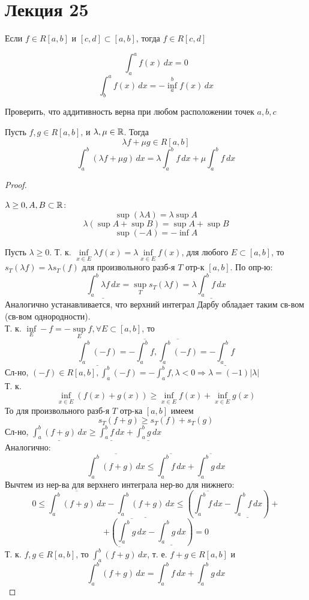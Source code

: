 \section{Лекция 25}
\begin{consequence}
  Если $f \in R[a, b]$ и $[c, d] \subset [a, b]$, тогда $f \in R[c, d]$
\end{consequence}
\begin{note}
  \[
  \int_{a}^{a} f(x) \, dx = 0
  \]
  \[
  \int_{b}^{a} f(x) \, dx = -\inf_{a}^{b} f(x) \, dx
  \]
\end{note}
\begin{task}
Проверить, что аддитивность верна при любом расположении точек $a, b, c$
\end{task}
\begin{consequence}
\label{cs:riemann_feature_2}
Пусть $f, g \in R[a, b]$, и $\lambda, \mu \in \mathbb{R}$. Тогда
\[
  \lambda f + \mu g \in R[a, b]
\]
\[
  \int_{a}^{b}  (\lambda f + \mu g) \, dx = \lambda \int_{a}^{b} f \, dx + \mu \int_{a}^{b} f \, dx
\]
\end{consequence}
\begin{proof}
\begin{note}
$\lambda \geq 0, A, B \subset \mathbb{R}$:
\[
\sup(\lambda A) = \lambda \sup A
\]
\[
\lambda(\sup A + \sup B) = \sup A + \sup B
\]
\[
  \sup(-A) = -\inf A
\]
\end{note}
Пусть $\lambda \geq 0$. Т. к. $\underset{x \in E}{\inf} \lambda f(x) = \lambda \underset{x \in E}{\inf} f(x)$, для любого $E \subset [a, b]$, то $s_T(\lambda f) = \lambda s_T(f)$ для произвольного разб-я $T$ отр-к $[a, b]$. По опр-ю:
\[
  \underline{\int_{a}^{b}  \lambda f \, dx} = \underset{T}{\sup} s_T(\lambda f) = \lambda \underline{\int_{a}^{b} f \, dx}
\]
Аналогично устанавливается, что верхний интеграл Дарбу обладает таким св-вом (св-вом однородности). \\
Т. к. $\underset{E}{\inf} -f = -\underset{E}{\sup} f, \forall E \subset [a, b]$, то
\[
\underline{\int_{a}^{b} (-f)} = -\overline{\int_{a}^{b} f}, \overline{\int_{a}^{b} (-f)} = -\underline{\int_{a}^{b} f}
\]
Сл-но, $(-f) \in R[a, b], \int_{a}^{b} (-f) = -\int_{a}^{b} f, \lambda < 0 \Rightarrow \lambda = (-1) \left|\lambda\right|$ \\
Т. к.
\[
  \underset{x \in E}{\inf} (f(x) + g(x)) \geq \underset{x \in E}{\inf} f(x) + \underset{x \in E}{\inf} g(x)
\]
То для произвольного разб-я $T$ отр-ка $[a, b]$ имеем
\[
  s_T(f + g) \geq s_T(f) + s_T(g)
\]
Сл-но, $\underline{\int_{a}^{b} (f + g) \, dx} \geq \underline{\int_{a}^{b} f \, dx} + \underline{\int_{a}^{b} g \, dx}$ \\
Аналогично:
\[
\overline{\int_{a}^{b} (f + g) \, dx} \leq \overline{\int_{a}^{b} f \, dx} + \overline{\int_{a}^{b} g \, dx}
\]
Вычтем из нер-ва для верхнего интеграла нер-во для нижнего:
\[
0 \leq \overline{\int_{a}^{b}  (f + g) \, dx} - \underline{\int_{a}^{b} (f + g)\, dx} \leq \left(\overline{\int_{a}^{b} f \, dx} - \underline{\int_{a}^{b} f \, dx}\right) + 
\]
\[
 + \left(\overline{\int_{a}^{b} g \, dx} - \underline{\int_{a}^{b} g \, dx}\right) = 0
\]
Т. к. $f, g \in R[a, b]$, то $\overline{\int_{a}^{b}  (f + g) \, dx}$, т. е. $f + g \in R[a, b]$ и
\[
  \int_{a}^{b} (f + g) \, dx = \int_{a}^{b} f \, dx + \int_{a}^{b} g \, dx
\]
\end{proof}

